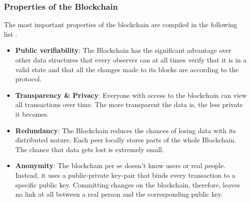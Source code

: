\subsubsection{Properties of the Blockchain}
The most important properties of the blockchain are compiled in the following list \cite{Wust2017}.
\begin{itemize}
  \item \textbf{Public verifiability}: The Blockchain has the significant advantage over other data structures that every observer can at all times verify that it is in a valid state and that all the changes made to its blocks are according to the protocol.
  \item \textbf{Transparency \& Privacy}: Everyone with access to the blockchain can view all transactions over time. The more transparent the data is, the less private it becomes.
  \item \textbf{Redundancy}: The Blockchain reduces the chances of losing data with its distributed nature. Each peer locally stores parts of the whole Blockchain. The chance that data gets lost is extremely small.
  \item \textbf{Anonymity}: The blockchain per se doesn't know users or real people. Instead, it uses a public-private key-pair that binds every transaction to a specific public key. Committing changes on the blockchain, therefore, leaves no link at all between a real person and the corresponding public key.
\end{itemize}

